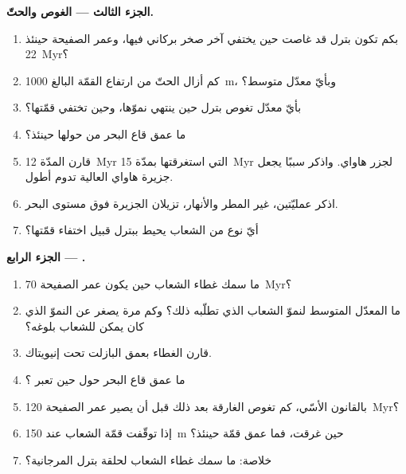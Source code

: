 \begin{problem}
\noindent\textbf{الجزء الثالث --- الغوص والحتّ.}
\begin{enumerate}[resume]
  \item بكم تكون بترل قد غاصت حين يختفي آخر صخر بركاني فيها، وعمر الصفيحة
        حينئذ \qty{22}{Myr}؟
  \item كم أزال الحتّ من ارتفاع القمّة البالغ \qty{1000}{m}، وبأيّ معدّل متوسط؟
  \item بأيّ معدّل تغوص بترل حين ينتهي نموّها، وحين تختفي قمّتها؟
  \item ما عمق قاع البحر من حولها حينئذ؟
  \item قارن المدّة \qty{12}{Myr} التي استغرقتها بمدّة \qty{15}{Myr} لجزر هاواي. واذكر
        سببًا يجعل جزيرة هاواي العالية تدوم أطول.
  \item اذكر عمليّتين، غير المطر والأنهار، تزيلان الجزيرة فوق مستوى البحر.
  \item أيّ نوع من الشعاب يحيط ببترل قبيل اختفاء قمّتها؟
\end{enumerate}

\noindent\textbf{الجزء الرابع ---  .}
\begin{enumerate}[resume]
  \item ما سمك غطاء الشعاب حين يكون عمر الصفيحة \qty{70}{Myr}؟
  \item ما المعدّل المتوسط لنموّ الشعاب الذي تطلّبه ذلك؟ وكم مرة يصغر عن النموّ
        الذي كان يمكن للشعاب بلوغه؟
  \item قارن الغطاء بعمق البازلت تحت إنيويتاك.
  \item ما عمق قاع البحر حول  حين تعبر ؟
  \item بالقانون الأسّي، كم تغوص  الغارقة بعد ذلك قبل أن يصير عمر الصفيحة
        \qty{120}{Myr}؟
  \item إذا توقّفت قمّة الشعاب عند \qty{150}{m} حين غرقت، فما عمق قمّة
         حينئذ؟
  \item خلاصة: ما سمك غطاء الشعاب لحلقة بترل المرجانية؟
\end{enumerate}
\end{problem}

